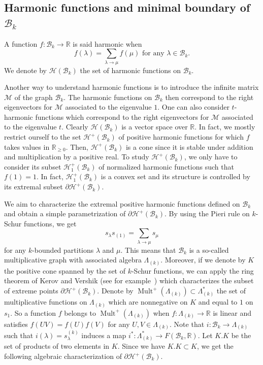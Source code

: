 \documentclass[ALCO,ThmDefs,Unicode,epreuves]{cedram}
\DeclareMathOperator{\Mult}{Mult}
\begin{document}
\subsection{Harmonic functions and minimal boundary of \texorpdfstring{$\mathcal{B}_{k}$}{Bk}}

\begin{defi}
A function $f:\mathcal{B}_{k}\rightarrow\mathbb{R}$ is said harmonic when
\[
f(\lambda)=\sum_{\lambda\rightarrow\mu}f(\mu)\text{ for any }\lambda
\in\mathcal{B}_{k}.
\]
We denote by $\mathcal{H}(\mathcal{B}_{k})$ the set of harmonic functions on
$\mathcal{B}_{k}$.
\end{defi}

Another way to understand harmonic functions is to introduce the infinite
matrix $\mathcal{M}$ of the graph $\mathcal{B}_{k}$. The harmonic functions on
$\mathcal{B}_{k}$ then correspond to the right eigenvectors for $\mathcal{M}$
associated to the eigenvalue $1$. One can also consider $t$-harmonic functions
which correspond to the right eigenvectors for $\mathcal{M}$ associated to the
eigenvalue $t$. Clearly $\mathcal{H}(\mathcal{B}_{k})$ is a vector space over
$\mathbb{R}$. In fact, we mostly restrict ourself to the set $\mathcal{H}%
^{+}(\mathcal{B}_{k})$ of positive harmonic functions for which $f$ takes
values in $\mathbb{R}_{\geq0}$. Then, $\mathcal{H}^{+}(\mathcal{B}_{k})$ is a
cone since it is stable under addition and multiplication by a positive real. To
study $\mathcal{H}^{+}(\mathcal{B}_{k})$, we only have to consider its subset
$\mathcal{H}_{1}^{+}(\mathcal{B}_{k})$ of normalized harmonic functions such
that $f(1)=1$. In fact, $\mathcal{H}_{1}^{+}(\mathcal{B}_{k})$ is a convex set
and its structure is controlled by its extremal subset $\partial
\mathcal{H}^{+}(\mathcal{B}_{k})$.

We aim to characterize the extremal positive harmonic functions
defined on $\mathcal{B}_{k}$ and obtain a simple parametrization of
$\partial\mathcal{H}^{+}(\mathcal{B}_{k})$. By using the Pieri rule on
$k$-Schur functions, we get%
\[
s_{\lambda}s_{(1)}=\sum_{\lambda\rightarrow\mu}s_{\mu}%
\]
for any $k$-bounded partitions $\lambda$ and $\mu$. This means that
$\mathcal{B}_{k}$ is a so-called multiplicative graph with associated algebra
$\Lambda_{(k)}$. Moreover, if we denote by $K$ the positive cone spanned by
the set of $k$-Schur functions, we can apply the ring theorem of Kerov and
Vershik (see for example~\cite[Section~8.4]{LT}) which characterizes the
subset of extreme points $\partial\mathcal{H}^{+}(\mathcal{B}_{k})$. Denote
by $\Mult ^{+}(\Lambda_{(k)})\subset\Lambda_{(k)}^{\ast}$ the set of
multiplicative functions on $\Lambda_{(k)}$ which are nonnegative on $K$ and
equal to $1$ on $s_{1}$. So a function $f$ belongs to $\Mult %
^{+}(\Lambda_{(k)})$ when $f:\Lambda_{(k)}\rightarrow\mathbb{R}$ is linear and
satisfies $f(UV)=f(U)f(V)$ for any $U,V\in\Lambda_{(k)}$. Note that
$i:\mathcal{B}_{k}\longrightarrow\Lambda_{(k)}$ such that $i(\lambda
)=s_{\lambda}^{(k)}$ induces a map $i^{\ast}:\Lambda_{(k)}^{\ast
}\longrightarrow F(\mathcal{B}_{k},\mathbb{R})$. Let $K.K$ be the set of products of two elements in $K$. Since we have $K.K\subset K$,
we get the following algebraic characterization of $\partial\mathcal{H}%
^{+}(\mathcal{B}_{k})$.
\end{document}
